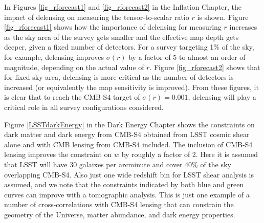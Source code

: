 In Figures  \ref{fig_rforecast1} and  \ref{fig_rforecast2} in the Inflation Chapter, the impact of delensing on measuring the tensor-to-scalar ratio $r$ is shown.  Figure \ref{fig_rforecast1} shows how the importance of delensing for measuring $r$ increases as the sky area of the survey gets smaller and the effective map depth gets deeper, given a fixed number of detectors.   For a survey targeting 1\% of the sky, for example, delensing improves $\sigma(r)$ by a factor of 5 to almost an order of magnitude, depending on the actual value of $r$.   Figure \ref{fig_rforecast2} shows that for fixed sky area, delensing is more critical as the number of detectors is increased (or equivalently the map sensitivity is improved).   From these figures, it is clear that to reach the CMB-S4 target of $\sigma(r) = 0.001$, delensing will play a critical role in all survey configurations considered.
 
Figure \ref{LSSTdarkEnergy} in the Dark Energy Chapter shows the constraints on dark matter and dark energy from CMB-S4 obtained from LSST cosmic shear alone and with CMB lensing from CMB-S4 included.  The inclusion of CMB-S4 lensing improves the constraint on $w$ by roughly a factor of 2.  Here it is assumed that LSST will have 30 galaixes per arcminute and cover 40\% of the sky overlapping CMB-S4.  Also just one wide redshift bin for LSST shear analysis is assumed, and we note that the constraints indicated by both blue and green curves can improve with a tomographic analysis.  This is just one example of a number of cross-correlations with CMB-S4 lensing that can constrain the geometry of the Universe, matter abundance, and dark energy properties.


%

%


